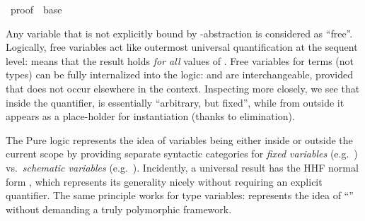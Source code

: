 %
\begin{isabellebody}%
\def\isabellecontext{proof}%
%
\isadelimtheory
\isanewline
\isanewline
\isanewline
%
\endisadelimtheory
%
\isatagtheory
{}\isamarkupfalse%
\ {\isachardoublequoteopen}proof{\isachardoublequoteclose}\ \ base\ %
\endisatagtheory
{\isafoldtheory}%
%
\isadelimtheory
%
\endisadelimtheory
%
\isamarkuptrue%
%
\isamarkuptrue%
%
\begin{isamarkuptext}%
Any variable that is not explicitly bound by \isa{{\isasymlambda}}-abstraction
  is considered as ``free''.  Logically, free variables act like
  outermost universal quantification at the sequent level:  means that the result
  holds \emph{for all} values of .  Free variables for
  terms (not types) can be fully internalized into the logic:  and  are interchangeable, provided
  that  does not occur elsewhere in the context.
  Inspecting  more closely, we see that inside the
  quantifier,  is essentially ``arbitrary, but fixed'',
  while from outside it appears as a place-holder for instantiation
  (thanks to \isa{{\isasymAnd}} elimination).

  The Pure logic represents the idea of variables being either inside
  or outside the current scope by providing separate syntactic
  categories for \emph{fixed variables} (e.g.\ ) vs.\
  \emph{schematic variables} (e.g.\ ).  Incidently, a
  universal result  has the HHF normal form , which represents its generality nicely without requiring
  an explicit quantifier.  The same principle works for type
  variables:  represents the idea of ``'' without demanding a truly polymorphic framework.


\end{isamarkuptext}
\end{isabellebody}
